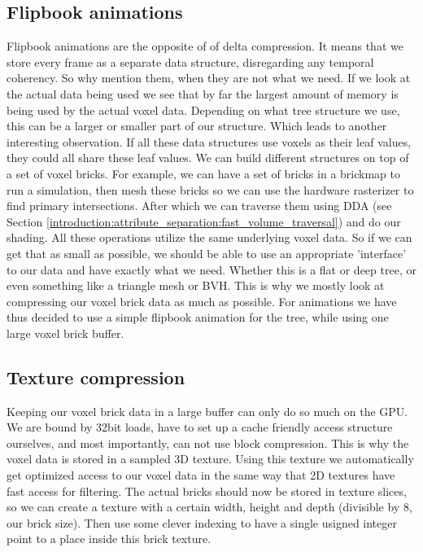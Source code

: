 \subsection{Flipbook animations} \label{approach:flipbook_animations}
Flipbook animations are the opposite of of delta compression. It means that we store every frame as a separate data structure, disregarding any temporal coherency. So why mention them, when they are not what we need. If we look at the actual data being used we see that by far the largest amount of memory is being used by the actual voxel data. Depending on what tree structure we use, this can be a larger or smaller part of our structure. Which leads to another interesting observation. If all these data structures use voxels as their leaf values, they could all share these leaf values. We can build different structures on top of a set of voxel bricks. For example, we can have a set of bricks in a brickmap to run a simulation, then mesh these bricks so we can use the hardware rasterizer to find primary intersections. After which we can traverse them using DDA (see Section \ref{introduction:attribute_separation:fast_volume_traversal}) and do our shading. All these operations utilize the same underlying voxel data. So if we can get that as small as possible, we should be able to use an appropriate 'interface' to our data and have exactly what we need. Whether this is a flat or deep tree, or even something like a triangle mesh or BVH. This is why we mostly look at compressing our voxel brick data as much as possible. For animations we have thus decided to use a simple flipbook animation for the tree, while using one large voxel brick buffer.
\subsection{Texture compression} \label{approach:texture_compression}
Keeping our voxel brick data in a large buffer can only do so much on the GPU. We are bound by 32bit loads, have to set up a cache friendly access structure ourselves, and most importantly, can not use block compression. This is why the voxel data is stored in a sampled 3D texture. Using this texture we automatically get optimized access to our voxel data in the same way that 2D textures have fast access for filtering. The actual bricks should now be stored in texture slices, so we can create a texture with a certain width, height and depth (divisible by 8, our brick size). Then use some clever indexing to have a single usigned integer point to a place inside this brick texture.


